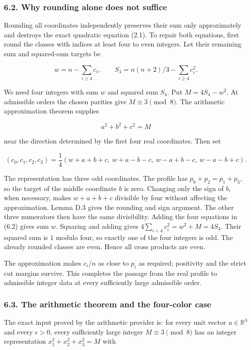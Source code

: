 \documentclass[english,11pt,a4paper]{article}
\begin{document}
\subsubsection{6.2. Why rounding alone does not suffice}\label{why-rounding-alone-does-not-suffice}

Rounding all coordinates independently preserves their sum only approximately and destroys the exact quadratic equation (2.1). To repair both equations, first round the classes with indices at least four to even integers. Let their remaining sum and squared-sum targets be

\[w=n-\sum_{i\ge4}c_i,\qquad S_4=n(n+2)/3-\sum_{i\ge4}c_i^2.\]

We need four integers with sum \(w\) and squared sum \(S_4\). Put \(M=4S_4-w^2\). At admissible orders the chosen parities give \(M\equiv3\pmod8\). The arithmetic approximation theorem supplies

\[a^2+b^2+c^2=M\]

near the direction determined by the first four real coordinates. Then set

\[(c_0,c_1,c_2,c_3)=\frac14
(w+a+b+c,\ w+a-b-c,\ w-a+b-c,\ w-a-b+c).
\tag{6.2}\]

The representation has three odd coordinates. The profile has \(p_0+p_2=p_1+p_3\), so the target of the middle coordinate \(b\) is zero. Changing only the sign of \(b\), when necessary, makes \(w+a+b+c\) divisible by four without affecting the approximation. Lemma D.3 gives the rounding and sign argument. The other three numerators then have the same divisibility. Adding the four equations in (6.2) gives sum \(w\). Squaring and adding gives \(4\sum_{i<4}c_i^2=w^2+M=4S_4\). Their squared sum is \(1\) modulo four, so exactly one of the four integers is odd. The already rounded classes are even. Hence all cross products are even.

The approximation makes \(c_i/n\) as close to \(p_i\) as required; positivity and the strict cut margins survive. This completes the passage from the real profile to admissible integer data at every sufficiently large admissible order.

\subsubsection{6.3. The arithmetic theorem and the four-color case}\label{the-arithmetic-theorem-and-the-four-color-case}

The exact input proved by the arithmetic provider is: for every unit vector \(u\in\mathbb R^3\) and every \(\epsilon>0\), every sufficiently large integer \(M\equiv3\pmod8\) has an integer representation \(x_1^2+x_2^2+x_3^2=M\) with
\end{document}
